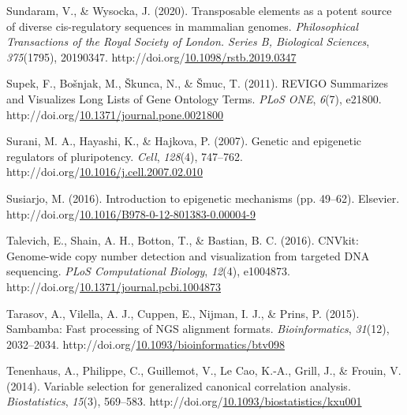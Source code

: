 \documentclass[12pt,twoside]{reedthesis}
\newlength{\cslhangindent}
\newenvironment{CSLReferences}[2] %
 {%
  \setlength{\parindent}{0pt}
  \ifodd #1 \everypar{\setlength{\hangindent}{\cslhangindent}}\ignorespaces\fi
  \ifnum #2 > 0
  \setlength{\parskip}{#2\baselineskip}
  \fi
 }%
 {}
\begin{document}
\begin{CSLReferences}{1}{0}
\leavevmode{}%
Sundaram, V., \& Wysocka, J. (2020). Transposable elements as a potent source of diverse cis-regulatory sequences in mammalian genomes. \emph{Philosophical Transactions of the Royal Society of London. Series B, Biological Sciences}, \emph{375}(1795), 20190347. http://doi.org/\href{https://doi.org/10.1098/rstb.2019.0347}{10.1098/rstb.2019.0347}

\leavevmode{}%
Supek, F., Bošnjak, M., Škunca, N., \& Šmuc, T. (2011). REVIGO Summarizes and Visualizes Long Lists of Gene Ontology Terms. \emph{PLoS ONE}, \emph{6}(7), e21800. http://doi.org/\href{https://doi.org/10.1371/journal.pone.0021800}{10.1371/journal.pone.0021800}

\leavevmode{}%
Surani, M. A., Hayashi, K., \& Hajkova, P. (2007). Genetic and epigenetic regulators of pluripotency. \emph{Cell}, \emph{128}(4), 747--762. http://doi.org/\href{https://doi.org/10.1016/j.cell.2007.02.010}{10.1016/j.cell.2007.02.010}

\leavevmode{}%
Susiarjo, M. (2016). Introduction to epigenetic mechanisms (pp. 49--62). Elsevier. http://doi.org/\href{https://doi.org/10.1016/B978-0-12-801383-0.00004-9}{10.1016/B978-0-12-801383-0.00004-9}

\leavevmode{}%
Talevich, E., Shain, A. H., Botton, T., \& Bastian, B. C. (2016). CNVkit: Genome-wide copy number detection and visualization from targeted DNA sequencing. \emph{PLoS Computational Biology}, \emph{12}(4), e1004873. http://doi.org/\href{https://doi.org/10.1371/journal.pcbi.1004873}{10.1371/journal.pcbi.1004873}

\leavevmode{}%
Tarasov, A., Vilella, A. J., Cuppen, E., Nijman, I. J., \& Prins, P. (2015). Sambamba: Fast processing of NGS alignment formats. \emph{Bioinformatics}, \emph{31}(12), 2032--2034. http://doi.org/\href{https://doi.org/10.1093/bioinformatics/btv098}{10.1093/bioinformatics/btv098}

\leavevmode{}%
Tenenhaus, A., Philippe, C., Guillemot, V., Le Cao, K.-A., Grill, J., \& Frouin, V. (2014). Variable selection for generalized canonical correlation analysis. \emph{Biostatistics}, \emph{15}(3), 569--583. http://doi.org/\href{https://doi.org/10.1093/biostatistics/kxu001}{10.1093/biostatistics/kxu001}


\end{CSLReferences}
\end{document}

